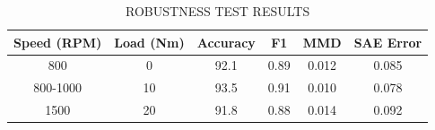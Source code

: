 \begin{table}[htbp]
\centering
\caption{ROBUSTNESS TEST RESULTS}
\label{tab:robustness}
\begin{tabular}{cccccc}
\toprule
Speed (RPM) & Load (Nm) & Accuracy & F1 & MMD & SAE Error \\
\midrule
800 & 0 & 92.1 & 0.89 & 0.012 & 0.085 \\
800-1000 & 10 & 93.5 & 0.91 & 0.010 & 0.078 \\
1500 & 20 & 91.8 & 0.88 & 0.014 & 0.092 \\
\bottomrule
\end{tabular}
\end{table}
